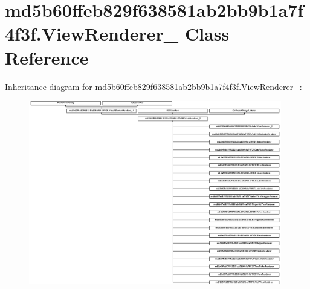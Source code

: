 \hypertarget{classmd5b60ffeb829f638581ab2bb9b1a7f4f3f_1_1ViewRenderer__2}{}\section{md5b60ffeb829f638581ab2bb9b1a7f4f3f.\+View\+Renderer\+\_ Class Reference}
\label{classmd5b60ffeb829f638581ab2bb9b1a7f4f3f_1_1ViewRenderer__2}
Inheritance diagram for md5b60ffeb829f638581ab2bb9b1a7f4f3f.\+View\+Renderer\+\_\+:\begin{figure}[H]
\begin{center}
\leavevmode
\includegraphics[height=8.019093cm]{classmd5b60ffeb829f638581ab2bb9b1a7f4f3f_1_1ViewRenderer__2}
\end{center}
\end{figure}

